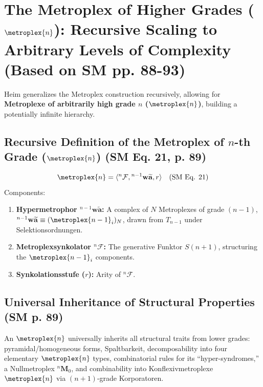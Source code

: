\documentclass[
    12pt,              %
    a4paper,           %
    headings=normal,   %
    twoside=true,      %
    BCOR=8mm,          %
]{scrbook}
\newcommand{\q}[1]{\enquote{#1}}
\newcommand{\hypermetrophor}[1]{{}^{#1}\mathbf{w\widetilde{a}}}
\newcommand{\metroplexsynkolator}[1]{{}^{#1}\mathcal{F}}
\newcommand{\nullmetroplex}[1]{{}^{#1}\mathbf{M}_0}
\newcommand{\metroplextotalitaet}[1]{T_{#1}}
\newcommand{\metroplexfunktor}{S}
\begin{document}
\section{The Metroplex of Higher Grades (\(\metroplex{n}\)): Recursive Scaling to Arbitrary Levels of Complexity (Based on SM pp. 88-93)}
\label{sec:ch5_higher_grade_metroplex}

Heim generalizes the Metroplex construction recursively, allowing for \textbf{Metroplexe of arbitrarily high grade \(n\) (\(\metroplex{n}\))}, building a potentially infinite hierarchy.

\subsection{Recursive Definition of the Metroplex of \(n\)-th Grade (\(\metroplex{n}\)) (SM Eq. 21, p. 89)}
\label{sec:ch5_recursive_def_metroplex_n}
\begin{equation} \label{eq:original_metroplex_n} %
\metroplex{n} = \langle \metroplexsynkolator{n}, \hypermetrophor{n-1}, r \rangle \quad (\text{SM Eq. 21})
\end{equation}
Components:
\begin{enumerate}
    \item  \textbf{Hypermetrophor \(\hypermetrophor{n-1}\):} A complex of \(N\) Metroplexes of grade \((n-1)\), \(\hypermetrophor{n-1} \equiv (\metroplex{n-1}_i)_N\), drawn from \(\metroplextotalitaet{n-1}\) under Selektionsordnungen.
    \item  \textbf{Metroplexsynkolator \(\metroplexsynkolator{n}\):} The generative Funktor \(\metroplexfunktor(n+1)\), structuring the \(\metroplex{n-1}_i\) components.
    \item  \textbf{Synkolationsstufe (\(r\)):} Arity of \(\metroplexsynkolator{n}\).
\end{enumerate}

\subsection{Universal Inheritance of Structural Properties (SM p. 89)}
\label{sec:ch5_universal_inheritance}
An \(\metroplex{n}\) universally inherits all structural traits from lower grades: pyramidal/homogeneous forms, Spaltbarkeit, decomposability into four elementary \(\metroplex{n}\) types, combinatorial rules for its \q{hyper-syndromes,} a Nullmetroplex \(\nullmetroplex{n}\), and combinability into Konflexivmetroplexe \(\metroplex{n}\) via \((n+1)\)-grade Korporatoren.
\end{document}
